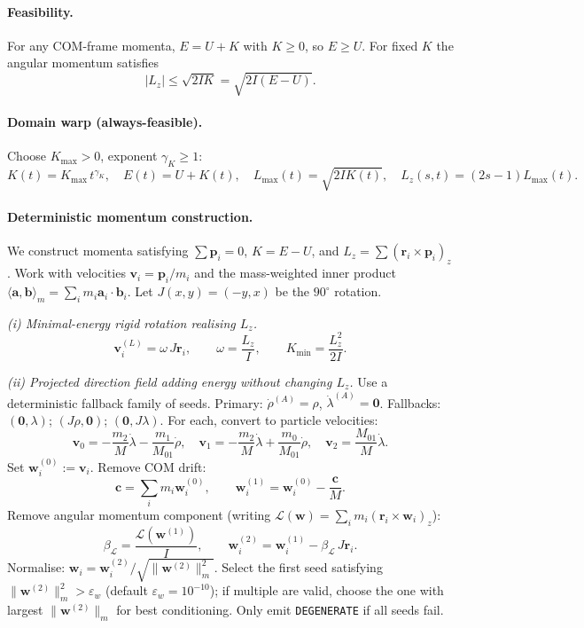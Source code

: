 \documentclass[11pt]{report}
\def\boldsymbol#1{#1}%
\begin{document}
\paragraph{Feasibility.} For any COM-frame momenta, $E=U+K$ with $K\ge 0$, so $E\ge U$. For fixed $K$ the angular momentum satisfies
\[
\boxed{|L_z|\le\sqrt{2IK}=\sqrt{2I(E-U)}.}
\]

\paragraph{Domain warp (always-feasible).} Choose $K_{\max}>0$, exponent $\gamma_K\ge 1$:
\[
\boxed{K(t)=K_{\max}\,t^{\gamma_K},\quad E(t)=U+K(t),\quad L_{\max}(t)=\sqrt{2IK(t)},\quad L_z(s,t)=(2s-1)L_{\max}(t).}
\]

\paragraph{Deterministic momentum construction.} We construct momenta satisfying $\sum\mathbf p_i=0$, $K=E-U$, and $L_z=\sum(\mathbf r_i\times\mathbf p_i)_z$. Work with velocities $\mathbf v_i=\mathbf p_i/m_i$ and the mass-weighted inner product $\langle\mathbf a,\mathbf b\rangle_m=\sum_i m_i\mathbf a_i\cdot\mathbf b_i$. Let $J(x,y)=(-y,x)$ be the $90^\circ$ rotation.

\emph{(i) Minimal-energy rigid rotation realising $L_z$.}
\[
\boxed{\mathbf v_i^{(L)}=\omega\,J\mathbf r_i,\qquad \omega=\frac{L_z}{I},\qquad K_{\min}=\frac{L_z^2}{2I}.}
\]

\emph{(ii) Projected direction field adding energy without changing $L_z$.} Use a deterministic fallback family of seeds. Primary: $\dot{\boldsymbol\rho}^{(A)}=\boldsymbol\rho$, $\dot{\boldsymbol\lambda}^{(A)}=\mathbf 0$. Fallbacks: $(\mathbf 0,\boldsymbol\lambda)$; $(J\boldsymbol\rho,\mathbf 0)$; $(\mathbf 0,J\boldsymbol\lambda)$. For each, convert to particle velocities:
\[
\boxed{\mathbf v_0=-\frac{m_2}{M}\dot{\boldsymbol\lambda}-\frac{m_1}{M_{01}}\dot{\boldsymbol\rho},\quad \mathbf v_1=-\frac{m_2}{M}\dot{\boldsymbol\lambda}+\frac{m_0}{M_{01}}\dot{\boldsymbol\rho},\quad \mathbf v_2=\frac{M_{01}}{M}\dot{\boldsymbol\lambda}.}
\]
Set $\mathbf w_i^{(0)}:=\mathbf v_i$. Remove COM drift:
\[
\mathbf c=\sum_i m_i\mathbf w_i^{(0)},\qquad \boxed{\mathbf w_i^{(1)}=\mathbf w_i^{(0)}-\frac{\mathbf c}{M}.}
\]
Remove angular momentum component (writing $\mathcal L(\mathbf w)=\sum_i m_i(\mathbf r_i\times\mathbf w_i)_z$):
\[
\beta_{\mathcal L}=\frac{\mathcal L(\mathbf w^{(1)})}{I},\qquad \mathbf w_i^{(2)}=\mathbf w_i^{(1)}-\beta_{\mathcal L}\,J\mathbf r_i.
\]
Normalise: $\mathbf w_i=\mathbf w_i^{(2)}/\sqrt{\|\mathbf w^{(2)}\|_m^2}$. Select the first seed satisfying $\|\mathbf w^{(2)}\|_m^2>\varepsilon_w$ (default $\varepsilon_w=10^{-10}$); if multiple are valid, choose the one with largest $\|\mathbf w^{(2)}\|_m$ for best conditioning. Only emit \texttt{DEGENERATE} if all seeds fail.
\end{document}
